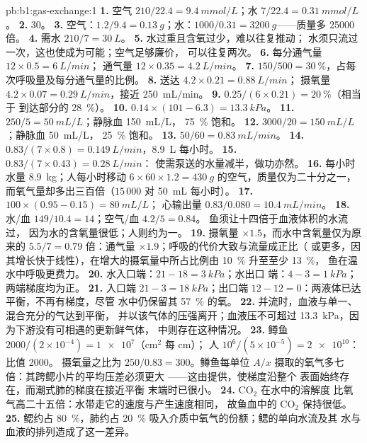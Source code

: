 \begin{solution}{pb:b1:gas-exchange:1}
\textbf{1.} 空气 $210/22.4 = \qty{9.4}{mmol/L}$；水 $7/22.4 =
\qty{0.31}{mmol/L}$。
\textbf{2.} 30。
\textbf{3.} 空气：$1.2/9.4 = \qty{0.13}{g}$；水：$1000/0.31 =
\qty{3200}{g}$——质量多 \num{25000} 倍。
\textbf{4.} 需水 $210/7 = \qty{30}{L}$。
\textbf{5.} 水过重且含氧过少，难以往复推动；
水须只流过一次，这也使成为可能；空气足够廉价，
可以往复两次。
\textbf{6.} 每分通气量 $12\times 0.5 = \qty{6}{L/min}$；
通气量 $12\times 0.35 = \qty{4.2}{L/min}$。
\textbf{7.} $150/500 = \qty{30}{\%}$，占每次呼吸量及每分通气量的比例。
\textbf{8.} 送达 $4.2\times 0.21 = \qty{0.88}{L/min}$；
摄氧量 $4.2\times 0.07 = \qty{0.29}{L/min}$，接近 \qty{250}{mL/min}。
\textbf{9.} $0.25/(6\times 0.21) = \qty{20}{\%}$（相当于
到达部分的 \qty{28}{\%}）。
\textbf{10.} $0.14\times(101 - 6.3) = \qty{13.3}{kPa}$。
\textbf{11.} $250/5 = \qty{50}{mL/L}$；静脉血 \qty{150}{mL/L}，
\qty{75}{\%} 饱和。
\textbf{12.} $3000/20 = \qty{150}{mL/L}$；静脉血 \qty{50}{mL/L}，
\qty{25}{\%} 饱和。
\textbf{13.} $50/60 = \qty{0.83}{mL/min}$。
\textbf{14.} $0.83/(7\times 0.8) = \qty{0.149}{L/min}$，\qty{8.9}{L}
每小时。
\textbf{15.} $0.83/(7\times 0.43) = \qty{0.28}{L/min}$：
使需泵送的水量减半，做功亦然。
\textbf{16.} 每小时水量 \qty{8.9}{kg}；人每小时移动 $6\times
60\times 1.2 = \qty{430}{g}$ 的空气，质量仅为二十分之一，
而氧气量却多出三百倍（$15\,000$
对 \qty{50}{mL} 每小时）。
\textbf{17.} $100\times(0.95 - 0.15) = \qty{80}{mL/L}$；
心输出量 $0.83/0.080 = \qty{10.4}{mL/min}$。
\textbf{18.} 水/血 $149/10.4 = 14$；空气/血 $4.2/5 = 0.84$。
鱼须让十四倍于血液体积的水流过，
因为水的含氧量很低；人则约为一。
\textbf{19.} 摄氧量 $\times 1.5$，而水中含氧量仅为原来的
$5.5/7 = 0.79$ 倍：通气量 $\times 1.9$；呼吸的代价大致与流量成正比（
或更多，因其增长快于线性），在增大的摄氧量中所占比例由 \qty{10}{\%}
升至至少 \qty{13}{\%}，
鱼在温水中呼吸更费力。
\textbf{20.} 水入口端：$21 - 18 = \qty{3}{kPa}$；水出口
端：$4 - 3 = \qty{1}{kPa}$；两端梯度均为正。
\textbf{21.} 入口端 $21 - 3 = \qty{18}{kPa}$；出口端 $12 - 12 =
0$：两液体已达平衡，不再有梯度，尽管
水中仍保留其 \qty{57}{\%} 的氧。
\textbf{22.} 并流时，血液与单一、混合充分的气达到平衡，
并以该气体的压强离开；血液压不可超过
\qty{13.3}{kPa}，因为下游没有可相遇的更新鲜气体，
中则存在这种情况。
\textbf{23.} 鳟鱼 $2000/(2\times 10^{-4}) = \num{1e7}$（cm$^2$ 每 cm）；
人 $10^6/(5\times 10^{-5}) = \num{2e10}$：比值 \num{2000}。
摄氧量之比为 $250/0.83 = 300$。鳟鱼每单位
$A/x$ 摄取的氧气多七倍：其跨鳃小片的平均压差必须更大
——这由提供，使梯度沿整个
表面始终存在，而潮式肺的梯度在接近平衡
末端时已很小。
\textbf{24.} $\mathrm{CO_2}$ 在水中的溶解度
比氧气高二十五倍：水带走它的速度与产生速度相同，
故鱼血中的 $\mathrm{CO_2}$ 保持很低。
\textbf{25.} 鳃约占 \qty{80}{\%}，肺约占 \qty{20}{\%}
吸入介质中氧气的份额；鳃的单向水流及其
水与血液的排列造成了这一差异。
\end{solution}
